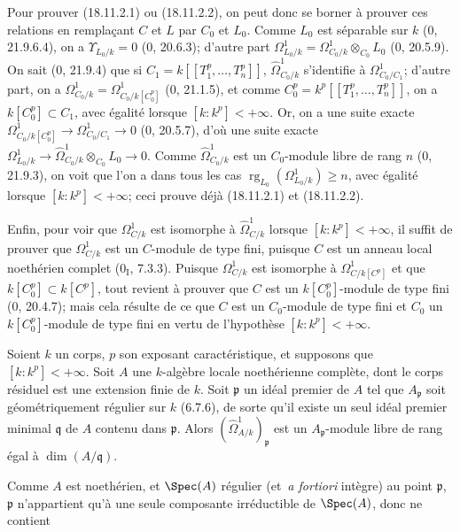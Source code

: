 Pour prouver (18.11.2.1) ou (18.11.2.2), on peut donc se borner à prouver ces relations en remplaçant $C$ et $L$ par $C_0$ et $L_0$. Comme $L_0$ est séparable sur $k$ (0, 21.9.6.4), on a $\Upsilon_{L_0/k}=0$ (0, 20.6.3); d'autre part $\Omega^1_{L_0/k}=\Omega^1_{C_0/k}\otimes_{C_0}L_0$ (0, 20.5.9). On sait (0, 21.9.4) que si $C_1=k[[T_1^p,\ldots,T_n^p]]$, $\hat{\Omega}^1_{C_0/k}$ s'identifie à $\Omega^1_{C_0/C_1}$; d'autre part, on a $\Omega^1_{C_0/k}=\Omega^1_{C_0/k[C_0^p]}$ (0, 21.1.5), et comme $C_0^p=k^p[[T_1^p,\ldots,T_n^p]]$, on a $k[C_0^p]\subset C_1$, avec égalité lorsque $[k:k^p]<+\infty$. Or, on a une suite exacte $\Omega^1_{C_0/k[C_0^p]}\to\Omega^1_{C_0/C_1}\to0$ (0, 20.5.7), d'où une suite exacte $\Omega^1_{L_0/k}\to\hat{\Omega}^1_{C_0/k}\otimes_{C_0}L_0\to0$. Comme $\hat{\Omega}^1_{C_0/k}$ est un $C_0$-module libre de rang $n$ (0, 21.9.3), on voit que l'on a dans tous les cas $\operatorname{rg}_{L_0}(\Omega^1_{L_0/k})\geq n$, avec égalité lorsque $[k:k^p]<+\infty$; ceci prouve déjà (18.11.2.1) et (18.11.2.2).

Enfin, pour voir que $\Omega^1_{C/k}$ est isomorphe à $\hat{\Omega}^1_{C/k}$ lorsque $[k:k^p]<+\infty$, il suffit de prouver que $\Omega^1_{C/k}$ est un $C$-module de type fini, puisque $C$ est un anneau local noethérien complet ($0_{\mathrm I}$, 7.3.3). Puisque $\Omega^1_{C/k}$ est isomorphe à $\Omega^1_{C/k[C^p]}$ et que $k[C_0^p]\subset k[C^p]$, tout revient à prouver que $C$ est un $k[C_0^p]$-module de type fini (0, 20.4.7); mais cela résulte de ce que $C$ est un $C_0$-module de type fini et $C_0$ un $k[C_0^p]$-module de type fini en vertu de l'hypothèse $[k:k^p]<+\infty$.

\begin{lemma}[18.11.3]
\label{IV.18.11.3}
Soient $k$ un corps, $p$ son exposant caractéristique, et supposons que $[k:k^p]<+\infty$. Soit $A$ une $k$-algèbre locale noethérienne complète, dont le corps résiduel est une extension finie de $k$. Soit $\mathfrak p$ un idéal premier de $A$ tel que $A_{\mathfrak p}$ soit géométriquement régulier sur $k$ (6.7.6), de sorte qu'il existe un seul idéal premier minimal $\mathfrak q$ de $A$ contenu dans $\mathfrak p$. Alors $(\hat{\Omega}^1_{A/k})_{\mathfrak p}$ est un $A_{\mathfrak p}$-module libre de rang égal à $\dim(A/\mathfrak q)$.
\end{lemma}

Comme $A$ est noethérien, et $\Spec(A)$ régulier (et \,\emph{a fortiori} intègre) au point $\mathfrak p$, $\mathfrak p$ n'appartient qu'à une seule composante irréductible de $\Spec(A)$, donc ne contient


